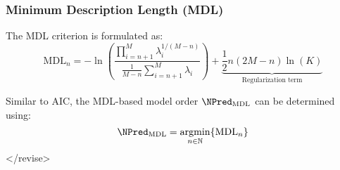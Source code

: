 \subsubsection{Minimum Description Length (MDL)}

The MDL criterion is formulated as:
\begin{equation}
    \mathrm{MDL}_n=-\ln \left(\frac{\prod_{i=n+1}^M \lambda_i^{1 /(M-n)}}{\frac{1}{M-n} \sum_{i=n+1}^M \lambda_i}\right)+\underbrace{\frac{1}{2} n(2 M-n) \ln (K)}_{\text{Regularization term}}
    \label{eq:MDL}
\end{equation}

Similar to AIC, the MDL-based model order \( \NPred_\mathrm{MDL} \) can be determined using:
\begin{equation}
    \NPred_\mathrm{MDL}=\underset{n \in \mathbb{N}}{\operatorname{argmin}}\{ \mathrm{MDL}_n \}
\end{equation}
</revise>
